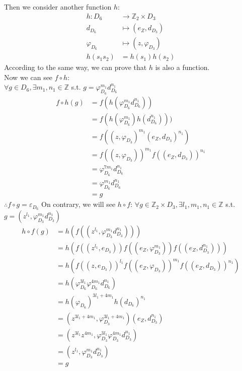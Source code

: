 \documentclass[12pt]{article}
\theoremstyle{neosn}
\begin{document}
    Then we consider another function $h$:
    \begin{align*}
        h:D_6 &\to \mathbb{Z}_2 \times D_3\\
            d_{D_6} &\longmapsto (e_Z,d_{D_3})\\
            \varphi_{D_6} &\longmapsto (z,\varphi_{D_3})\\
            h(s_1s_2)&=h(s_1)h(s_2)
    \end{align*}
    According to the same way, we can prove that $h$ is also a function.\\
    Now we can see $f\circ h$:\\
    $\forall g \in D_6,\exists m_1,n_1 \in \mathbb{Z}$ s.t. $g=\varphi_{D_6}^{m_1}d_{D_6}^{n_1}$\\
    \begin{align*}
        f\circ h(g) &= f(h(\varphi_{D_6}^{m_1}d_{D_6}^{n_1}))\\
                    &= f(h(\varphi_{D_6}^{m_1})h(d_{D_6}^{n_1})))\\
                    &= f((z,\varphi_{D_3})^{m_1}(e_Z,d_{D_3})^{n_1})\\
                    &= f((z,\varphi_{D_3}))^{m_1}f((e_Z,d_{D_3}))^{n_1}\\
                    &= \varphi_{D_6}^{7m_1}d_{D_6}^{n_1}\\
                    &= \varphi_{D_6}^{m_1}d_{D_6}^{n_1}\\
                    &= g
    \end{align*}
    $\therefore f\circ g = \varepsilon_{D_6}$
    On contrary, we will see $h \circ f$:
    $\forall g \in \mathbb{Z}_2\times D_3,\exists l_1,m_1,n_1 \in \mathbb{Z}$ s.t. $g= (z^{l_1},\varphi_{D_3}^{m_1}d_{D_3}^{n_1})$\\
    \begin{align*}
        h \circ f(g) &= h(f((z^{l_1},\varphi_{D_3}^{m_1}d_{D_3}^{n_1})))\\
                    &= h(f((z^{l_1},e_{D_3}))f((e_Z,\varphi_{D_3}^{m_1}))f((e_Z,d_{D_3}^{n_1})))\\
                    &= h(f((z,e_{D_3}))^{l_1}f((e_Z,\varphi_{D_3}))^{m_1}f((e_Z,d_{D_3}))^{n_1})\\
                    &= h(\varphi_{D_6}^{3l_1}\varphi_{D_6}^{4m_1}d_{D_6}^{n_1})\\
                    &=h(\varphi_{D_6})^{3l_1+4m_1}h(d_{D_6})^{n_1}\\
                    &=(z^{3l_1+4m_1},\varphi_{D_3}^{3l_1+4m_1})(e_Z,d_{D_3}^{n_1})\\
                    &=(z^{3l_1}z^{4m_1},\varphi_{D_3}^{3l_1}\varphi_{D_3}^{4m_1}d_{D_3}^{n_1})\\
                    &=(z^{l_1},\varphi_{D_3}^{m_1}d_{D_3}^{n_1})\\
                    &=g
    \end{align*}
\end{document}
